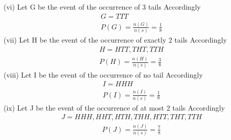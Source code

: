 \documentclass{article}
\begin{document}
(vi) Let G be the event of the occurrence of 3 tails
Accordingly\\
\begin{align}
    G=TTT\\
    P(G) = \frac{n(G)}{n(s)} = \frac{1}{8}
\end{align}
(vii) Let H be the event of the occurrence of exactly 2 tails
Accordingly \\
\begin{align}
    H=HTT,THT,TTH\\
    P(H) = \frac{n(H)}{n(s)} = \frac{3}{8}
\end{align}
(viii) Let I be the event of the occurrence of no tail
Accordingly\\
\begin{align}
     I=HHH\\
      P(I) = \frac{n(I)}{n(s)} = \frac{1}{8}
\end{align}
(ix) Let J be the event of the occurrence of at most 2 tails
Accordingly \\
\begin{align}
    J=HHH,HHT,HTH,THH,HTT,THT,TTH
\end{align}
\begin{align}
    P(J) = \frac{n(J)}{n(s)} = \frac{7}{8}
\end{align}
\end{document}
